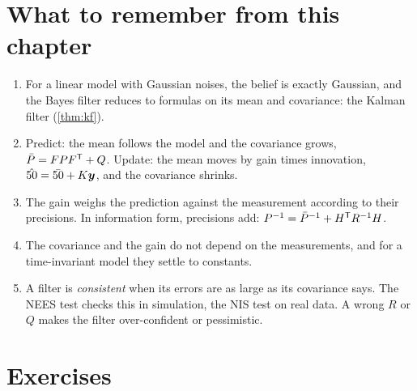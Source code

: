 \section*{What to remember from this chapter}

\begin{enumerate}[nosep]
  \item For a linear model with Gaussian noises, the belief is exactly
    Gaussian, and the Bayes filter reduces to formulas on its mean and
    covariance: the Kalman filter (\cref{thm:kf}).
  \item Predict: the mean follows the model and the covariance grows,
    $\bar P=FPF^{\mathsf{T}}+Q$. Update: the mean moves by gain times innovation,
    $\hat{50}=\bar{50}+K\bm{y}$, and the covariance shrinks.
  \item The gain weighs the prediction against the measurement according
    to their precisions. In information form, precisions add:
    $P^{-1}=\bar P^{-1}+H^{\mathsf{T}} R^{-1}H$.
  \item The covariance and the gain do not depend on the measurements, and
    for a time-invariant model they settle to constants.
  \item A filter is \emph{consistent} when its errors are as large as its
    covariance says. The NEES test checks this in simulation, the NIS test
    on real data. A wrong $R$ or $Q$ makes the filter over-confident or
    pessimistic.
\end{enumerate}

\FloatBarrier
\section*{Exercises}

